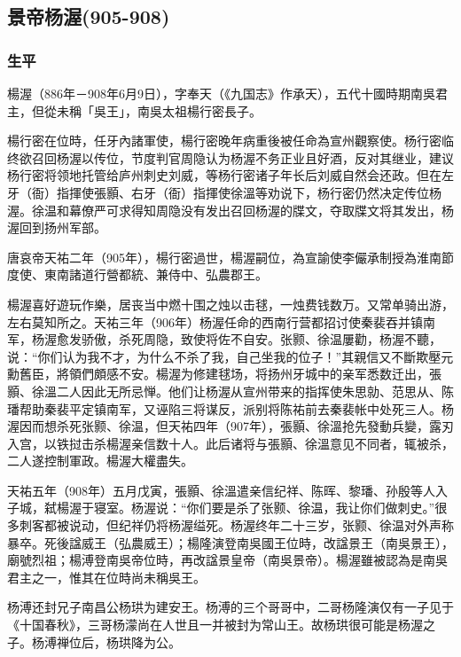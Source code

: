 
\subsection{景帝杨渥\tiny(905-908)}

\subsubsection{生平}

楊渥（886年－908年6月9日），字奉天（《九国志》作承天），五代十國時期南吳君主，但從未稱「吳王」，南吳太祖楊行密長子。

楊行密在位時，任牙內諸軍使，楊行密晚年病重後被任命為宣州觀察使。杨行密临终欲召回杨渥以传位，节度判官周隐认为杨渥不务正业且好酒，反对其继业，建议杨行密将领地托管给庐州刺史刘威，等杨行密诸子年长后刘威自然会还政。但在左牙（衙）指揮使張顥、右牙（衙）指揮使徐溫等劝说下，杨行密仍然决定传位杨渥。徐温和幕僚严可求得知周隐没有发出召回杨渥的牒文，夺取牒文将其发出，杨渥回到扬州军部。

唐哀帝天祐二年（905年），楊行密過世，楊渥嗣位，為宣諭使李儼承制授為淮南節度使、東南諸道行營都統、兼侍中、弘農郡王。

楊渥喜好遊玩作樂，居丧当中燃十围之烛以击毬，一烛费钱数万。又常单骑出游，左右莫知所之。天祐三年（906年）杨渥任命的西南行营都招讨使秦裴吞并镇南军，杨渥愈发骄傲，杀死周隐，致使将佐不自安。张颢、徐温屢勸，杨渥不聽，说：“你们认为我不才，为什么不杀了我，自己坐我的位子！”其親信又不斷欺壓元勳舊臣，將領們頗感不安。楊渥为修建毬场，将扬州牙城中的亲军悉数迁出，張顥、徐溫二人因此无所忌惮。他们让杨渥从宣州带来的指挥使朱思勍、范思从、陈璠帮助秦裴平定镇南军，又诬陷三将谋反，派别将陈祐前去秦裴帐中处死三人。杨渥因而想杀死张颢、徐温，但天祐四年（907年），張顥、徐溫抢先發動兵變，露刃入宫，以铁挝击杀楊渥亲信数十人。此后诸将与張顥、徐溫意见不同者，辄被杀，二人遂控制軍政。楊渥大權盡失。

天祐五年（908年）五月戊寅，張顥、徐溫遣亲信纪祥、陈晖、黎璠、孙殷等人入子城，弑楊渥于寝室。杨渥说：“你们要是杀了张颢、徐温，我让你们做刺史。”很多刺客都被说动，但纪祥仍将杨渥缢死。杨渥终年二十三岁，张颢、徐温对外声称暴卒。死後諡威王（弘農威王）；楊隆演登南吳國王位時，改諡景王（南吳景王），廟號烈祖；楊溥登南吳帝位時，再改諡景皇帝（南吳景帝）。楊渥雖被認為是南吳君主之一，惟其在位時尚未稱吳王。

杨溥还封兄子南昌公杨珙为建安王。杨溥的三个哥哥中，二哥杨隆演仅有一子见于《十国春秋》，三哥杨濛尚在人世且一并被封为常山王。故杨珙很可能是杨渥之子。杨溥禅位后，杨珙降为公。


